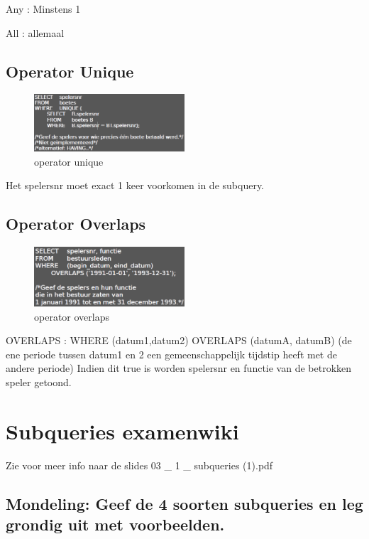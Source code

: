 Any : Minstens 1

All : allemaal


\subsection{Operator Unique}

\begin{figure}[h!]
\centering
  \includegraphics[width=0.5\textwidth]{./figures/unique.png}
  \caption{operator unique}
  \label{fig:operator unique}
\end{figure}

Het spelersnr moet exact  1 keer voorkomen in de subquery. 



\subsection{Operator Overlaps}

\begin{figure}[h!]
\centering
  \includegraphics[width=0.5\textwidth]{./figures/overlaps.png}
  \caption{operator overlaps}
  \label{fig:operator ovelaps}
\end{figure}

OVERLAPS :  WHERE (datum1,datum2) OVERLAPS (datumA, datumB)  (de ene periode tussen datum1 en 2 een gemeenschappelijk tijdstip heeft met de andere periode) Indien dit true is worden spelersnr en functie van de betrokken speler getoond.

\newpage
\section{Subqueries examenwiki}
Zie voor meer info naar de slides 03 \_ 1 \_ subqueries (1).pdf

\subsection{Mondeling: Geef de 4 soorten subqueries en leg grondig uit met voorbeelden. }

